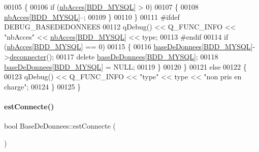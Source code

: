 \begin{DoxyCode}
00105         \{
00106             \textcolor{keywordflow}{if} (\hyperlink{class_base_de_donnees_a5d2e5264c826c6600fd20a9831fd1782}{nbAcces}[\hyperlink{terminalmobile_2base_de_donnees_8h_aaf0ca062171227e6cb5722ad110fb783}{BDD\_MYSQL}] > 0)
00107             \{
00108                 \hyperlink{class_base_de_donnees_a5d2e5264c826c6600fd20a9831fd1782}{nbAcces}[\hyperlink{terminalmobile_2base_de_donnees_8h_aaf0ca062171227e6cb5722ad110fb783}{BDD\_MYSQL}]--;
00109             \}
00110         \}
00111 \textcolor{preprocessor}{        #ifdef DEBUG\_BASEDEDONNEES}
00112         qDebug() << Q\_FUNC\_INFO << \textcolor{stringliteral}{"nbAcces"} << \hyperlink{class_base_de_donnees_a5d2e5264c826c6600fd20a9831fd1782}{nbAcces}[\hyperlink{terminalmobile_2base_de_donnees_8h_aaf0ca062171227e6cb5722ad110fb783}{BDD\_MYSQL}] << type;
00113 \textcolor{preprocessor}{        #endif}
00114         \textcolor{keywordflow}{if} (\hyperlink{class_base_de_donnees_a5d2e5264c826c6600fd20a9831fd1782}{nbAcces}[\hyperlink{terminalmobile_2base_de_donnees_8h_aaf0ca062171227e6cb5722ad110fb783}{BDD\_MYSQL}] == 0)
00115         \{
00116             \hyperlink{class_base_de_donnees_a218c44b630523435e2f6f8f2f0c484f8}{baseDeDonnees}[\hyperlink{terminalmobile_2base_de_donnees_8h_aaf0ca062171227e6cb5722ad110fb783}{BDD\_MYSQL}]->\hyperlink{class_base_de_donnees_ae780999d25a26a0e4dbe0706a4785978}{deconnecter}();
00117             \textcolor{keyword}{delete} \hyperlink{class_base_de_donnees_a218c44b630523435e2f6f8f2f0c484f8}{baseDeDonnees}[\hyperlink{terminalmobile_2base_de_donnees_8h_aaf0ca062171227e6cb5722ad110fb783}{BDD\_MYSQL}];
00118             \hyperlink{class_base_de_donnees_a218c44b630523435e2f6f8f2f0c484f8}{baseDeDonnees}[\hyperlink{terminalmobile_2base_de_donnees_8h_aaf0ca062171227e6cb5722ad110fb783}{BDD\_MYSQL}] = NULL;
00119         \}
00120     \}
00121     \textcolor{keywordflow}{else}
00122     \{
00123         qDebug() << Q\_FUNC\_INFO << \textcolor{stringliteral}{"type"} << type << \textcolor{stringliteral}{"non pris en charge"};
00124     \}
00125 \}
\end{DoxyCode}
\mbox{\label{class_base_de_donnees_a00388973f3ec42e5c8e76e7af7e124b2}} 
\paragraph{\texorpdfstring{est\+Connecte()}{estConnecte()}\hspace{0.1cm}{\footnotesize\ttfamily [1/2]}}
{\footnotesize\ttfamily bool Base\+De\+Donnees\+::est\+Connecte (\begin{DoxyParamCaption}{ }\end{DoxyParamCaption})}



